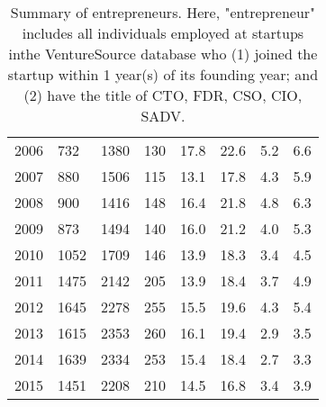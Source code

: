 \begin{table}[ht]
\begin{tabular}{p{1.75cm}p{1.75cm}p{1.75cm}p{1.75cm}p{1.75cm}p{1.75cm}p{1.75cm}p{1.75cm}}
  2006 & 732 & 1380 & 130 & 17.8 & 22.6 & 5.2 & 6.6 \\ 
  2007 & 880 & 1506 & 115 & 13.1 & 17.8 & 4.3 & 5.9 \\ 
  2008 & 900 & 1416 & 148 & 16.4 & 21.8 & 4.8 & 6.3 \\ 
  2009 & 873 & 1494 & 140 & 16.0 & 21.2 & 4.0 & 5.3 \\ 
  2010 & 1052 & 1709 & 146 & 13.9 & 18.3 & 3.4 & 4.5 \\ 
  2011 & 1475 & 2142 & 205 & 13.9 & 18.4 & 3.7 & 4.9 \\ 
  2012 & 1645 & 2278 & 255 & 15.5 & 19.6 & 4.3 & 5.4 \\ 
  2013 & 1615 & 2353 & 260 & 16.1 & 19.4 & 2.9 & 3.5 \\ 
  2014 & 1639 & 2334 & 253 & 15.4 & 18.4 & 2.7 & 3.3 \\ 
  2015 & 1451 & 2208 & 210 & 14.5 & 16.8 & 3.4 & 3.9 \\ 
   \bottomrule
\end{tabular}
\endgroup
\caption{Summary of entrepreneurs. Here, "entrepreneur" includes all individuals employed at startups inthe VentureSource database who (1) joined the startup within 1 year(s) of its founding year; and (2) have the title of CTO, FDR, CSO, CIO, SADV.} 
\end{table}
